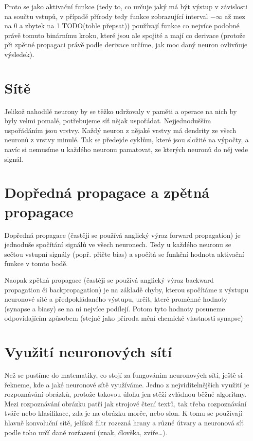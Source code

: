 \documentclass[12pt]{report}			%
\begin{document}
					Proto se jako aktivační funkce (tedy to, co určuje jaký má být výstup v závislosti na součtu vstupů, v případě přírody tedy funkce zobrazující interval $-\infty$ až mez na 0 a zbytek na 1 TODO(tohle přepsat)) používají funkce co nejvíce podobné právě tomuto binárnímu kroku, které jsou ale spojité a mají co  derivace (protože při zpětné propagaci právě podle derivace určíme, jak moc daný neuron ovlivňuje výsledek).
				
				\section{Sítě}
					Jelikož nahodilé neurony by se těžko udržovaly v paměti a operace na nich by byly velmi pomalé, potřebujeme síť nějak uspořádat. Nejjednodušším uspořádáním jsou vrstvy. Každý neuron z nějaké vrstvy má \gls{dendrit}y ze všech neuronů z vrstvy minulé. Tak se předejde cyklům, které jsou složité na výpočty, a navíc si nemusíme u každého neuronu pamatovat, ze kterých neuronů do něj vede signál.
					
				\section{Dopředná propagace a zpětná propagace}
					Dopředná propagace (častěji se používá anglický výraz forward propagation) je jednoduše spočítání signálů ve všech neuronech. Tedy u každého neuronu se sečtou vstupní signály (popř. přičte bias) a spočítá se funkční hodnota aktivační funkce v tomto bodě.
					
					Naopak zpětná propagace (častěji se používá anglický výraz backward propagation či backpropagation) je na základě chyby, kterou spočítáme z výstupu neuronové sítě a předpokládaného výstupu, určit, které proměnné hodnoty (\gls{synapse} a biasy) se na ní nejvíce podílejí. Potom tyto hodnoty posuneme odpovídajícím způsobem (stejně jako příroda mění chemické vlastnosti \gls{synapse})
					
				\section{Využití neuronových sítí}
					Než se pustíme do matematiky, co stojí za fungováním neuronových sítí, ještě si řekneme, kde a jaké neuronové sítě využíváme. Jedno z nejviditelnějších využití je rozpoznávání obrázků, protože takovou úlohu jen stěží zvládnou běžné algoritmy. Mezi rozpoznávání obrázku patří jak strojové čtení textů, tak třeba rozpoznávání tváře nebo klasifikace, zda je na obrázku morče, nebo slon. K tomu se používají hlavně konvoluční sítě, jelikož filtr rozezná hrany a různé útvary a neuronová síť podle toho určí dané rozřazení (znak, člověka, zvíře\ldots).
					
\end{document}
